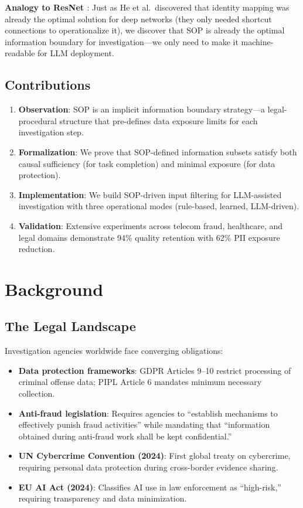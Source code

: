 \documentclass[letterpaper]{article}
\begin{document}
\textbf{Analogy to ResNet \citep{he2016}}: Just as He et al.~discovered that identity mapping was already the optimal solution for deep networks (they only needed shortcut connections to operationalize it), we discover that SOP is already the optimal information boundary for investigation---we only need to make it machine-readable for LLM deployment.

\subsection{Contributions}

\begin{enumerate}
    \item \textbf{Observation}: SOP is an implicit information boundary strategy---a legal-procedural structure that pre-defines data exposure limits for each investigation step.
    \item \textbf{Formalization}: We prove that SOP-defined information subsets satisfy both causal sufficiency (for task completion) and minimal exposure (for data protection).
    \item \textbf{Implementation}: We build SOP-driven input filtering for LLM-assisted investigation with three operational modes (rule-based, learned, LLM-driven).
    \item \textbf{Validation}: Extensive experiments across telecom fraud, healthcare, and legal domains demonstrate 94\% quality retention with 62\% PII exposure reduction.
\end{enumerate}

\section{Background}

\subsection{The Legal Landscape}

Investigation agencies worldwide face converging obligations:

\begin{itemize}
    \item \textbf{Data protection frameworks}: GDPR Articles 9--10 restrict processing of criminal offense data; PIPL Article 6 mandates minimum necessary collection.
    \item \textbf{Anti-fraud legislation}: Requires agencies to ``establish mechanisms to effectively punish fraud activities'' while mandating that ``information obtained during anti-fraud work shall be kept confidential.''
    \item \textbf{UN Cybercrime Convention (2024)}: First global treaty on cybercrime, requiring personal data protection during cross-border evidence sharing.
    \item \textbf{EU AI Act (2024)}: Classifies AI use in law enforcement as ``high-risk,'' requiring transparency and data minimization.
\end{itemize}
\end{document}
